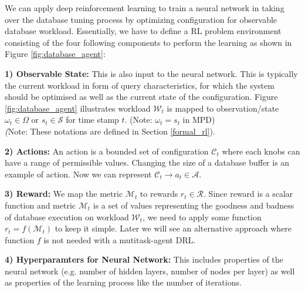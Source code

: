 We can apply deep reinforcement learning to train a neural network in taking
over the database tuning process by optimizing configuration for observable database workload.
Essentially, we have to define a RL problem environment
consisting of the four following components to perform the learning as shown in Figure \ref{fig:database_agent}:


\textbf{1) Observable State:} This is also input to the neural network. This is typically the current workload in form of
query characteristics, for which the system should be optimised as well as the current state
of the configuration. Figure \ref{fig:database_agent} illustrates workload $\mathcal{W}_t$ is mapped to observation/state $\omega_t \in \Omega$ or $s_t \in  \mathcal{S}$ for time stamp $t$. (Note: $\omega_t = s_t$ in MPD)\\
\textit(Note: These notations are defined in Section \ref{formal_rl}).

\textbf{2) Actions:} An action is a bounded set of configuration $\mathcal{C}_t$ where each knobs can have a range of permissible values.
Changing the size of a database buffer is an example of action. Now we can represent $\mathcal{C}_t  \rightarrow a_t \in \mathcal{A}$.

\textbf{3) Reward:}
We map the metric $\mathcal{M}_t$ to rewards $r_t \in \mathcal{R}$. Since reward is a scalar function and metric $\mathcal{M}_t$ is a set of values representing the goodness and badness of database execution on workload $\mathcal{W}_t$, we need to apply some function $r_t = f(\mathcal{M}_t)$ to keep it simple. Later we will see an alternative approach where function $f$ is not needed with a mutitask-agent DRL.

\textbf{4) Hyperparamters for Neural Network:}
This includes properties of
the neural network (e.g. number of hidden layers, number of nodes per layer) as well as
properties of the learning process like the number of iterations.







